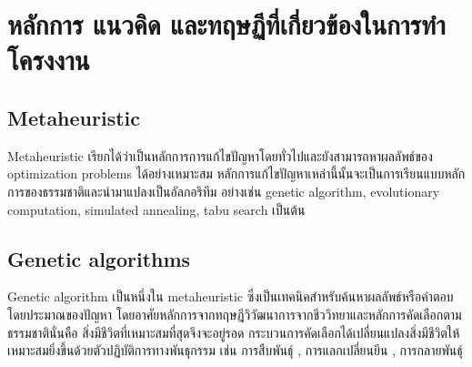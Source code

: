 \iffalse
\section{Tools}
\subsection{Gurobi Optimizer}
Gurobi Optimizer เป็น Solver ที่ใช้สำหรับแก้ปัญหา optimization โดยที่จะเน้นไปทางด้านของปัญหาต่าง ๆ ดังนี้ 
\begin{itemize}
  \item Linear programming (LP)
  \item Mixed-integer linear programming (MILP)
  \item Quadratic programming (QP)
  \item Mixed-integer quadratic programming (MIQP)
  \item Quadratically-constrained programming (QCP)
  \item Mixed-integer quadratically-constrained programming (MIQCP)
\end{itemize}
ผลลัพธ์ที่ได้จาก Gurobi Optimizer อาจนำมาใช้เป็นตัวเปรียบเทียบประสิทธิภาพกับผลลัพธ์การทำงานที่ได้จากอัลกอลิทึมของเรา
\fi
\section{หลักการ แนวคิด และทฤษฏีที่เกี่ยวข้องในการทำโครงงาน }
\subsection{Metaheuristic}
Meta­heuristic \cite{metaheuris} เรียกได้ว่าเป็นหลักการการแก้ไขปัญหาโดยทั่วไปและยังสามารถหาผลลัพธ์ของ optimization problems ได้อย่างเหมาะสม
หลักการแก้ไขปัญหาเหล่านี้นั้นจะเป็นการเรียนแบบหลักการของธรรมชาติและนำมาแปลงเป็นอัลกอริทึม อย่างเช่น genetic algorithm, evolutionary computation, simulated annealing, tabu search เป็นต้น
\subsection{Genetic algorithms}
Genetic algorithm \cite{ga} เป็นหนึ่งใน metaheuristic ซึ่งเป็นเทคนิคสำหรับค้นหาผลลัพธ์หรือคำตอบโดยประมาณของปัญหา โดยอาศัยหลักการจากทฤษฎีวิวัฒนาการจากชีววิทยาและหลักการคัดเลือกตามธรรมชาตินั่นคือ 
สิ่งมีชีวิตที่เหมาะสมที่สุดจึงจะอยู่รอด กระบวนการคัดเลือกได้เปลี่ยนแปลงสิ่งมีชีวิตให้เหมาะสมยิ่งขึ้นด้วยตัวปฏิบัติการทางพันธุกรรม เช่น การสืบพันธุ์ , การแลกเปลี่ยนยีน , การกลายพันธุ์  


